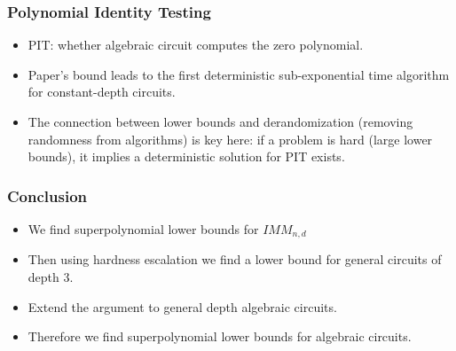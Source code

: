 \documentclass{beamer}
\begin{document}
\begin{frame}[allowframebreaks]
\frametitle{Polynomial Identity Testing}
\begin{itemize}
    \item PIT: whether algebraic circuit computes the zero polynomial. 
    \item Paper's bound leads to the first deterministic sub-exponential time algorithm for constant-depth circuits. 
    \item The connection between lower bounds and derandomization (removing randomness from algorithms) is key here: if a problem is hard (large lower bounds), it implies a deterministic solution for PIT exists.
\end{itemize}

    
\end{frame}

\begin{frame}[allowframebreaks]
\frametitle{Conclusion}
\begin{itemize}
    \item We find superpolynomial lower bounds for $IMM_{n,d}$
    \item Then using hardness escalation we find a lower bound for general circuits of depth 3.
    \item Extend the argument to general depth algebraic circuits.
    \item Therefore we find superpolynomial lower bounds for algebraic circuits.
\end{itemize}

    
\end{frame}



\end{document}
